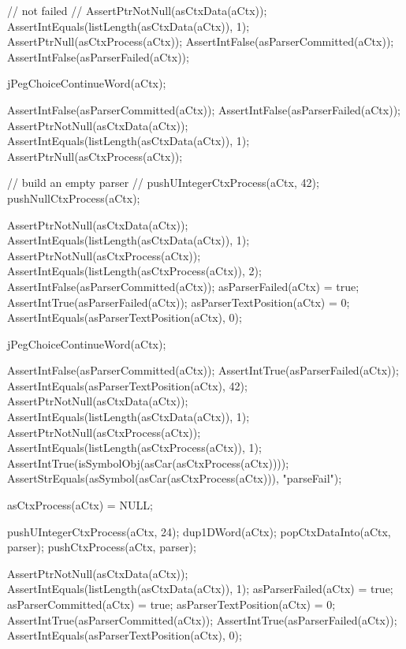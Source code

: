 \startCTest
  // not failed
  //
  AssertPtrNotNull(asCtxData(aCtx));
  AssertIntEquals(listLength(asCtxData(aCtx)), 1);
  AssertPtrNull(asCtxProcess(aCtx));
  AssertIntFalse(asParserCommitted(aCtx));
  AssertIntFalse(asParserFailed(aCtx));
  
  jPegChoiceContinueWord(aCtx);
  
  AssertIntFalse(asParserCommitted(aCtx));
  AssertIntFalse(asParserFailed(aCtx));
  AssertPtrNotNull(asCtxData(aCtx));
  AssertIntEquals(listLength(asCtxData(aCtx)), 1);
  AssertPtrNull(asCtxProcess(aCtx));
\stopCTest
\stopTestCase


\startCTest
  // build an empty parser
  //
  pushUIntegerCtxProcess(aCtx, 42);
  pushNullCtxProcess(aCtx);

  AssertPtrNotNull(asCtxData(aCtx));
  AssertIntEquals(listLength(asCtxData(aCtx)), 1);
  AssertPtrNotNull(asCtxProcess(aCtx));
  AssertIntEquals(listLength(asCtxProcess(aCtx)), 2);
  AssertIntFalse(asParserCommitted(aCtx));
  asParserFailed(aCtx) = true;
  AssertIntTrue(asParserFailed(aCtx));
  asParserTextPosition(aCtx) = 0;
  AssertIntEquals(asParserTextPosition(aCtx), 0);
  
  jPegChoiceContinueWord(aCtx);
  
  AssertIntFalse(asParserCommitted(aCtx));
  AssertIntTrue(asParserFailed(aCtx));
  AssertIntEquals(asParserTextPosition(aCtx), 42);
  AssertPtrNotNull(asCtxData(aCtx));
  AssertIntEquals(listLength(asCtxData(aCtx)), 1);
  AssertPtrNotNull(asCtxProcess(aCtx));
  AssertIntEquals(listLength(asCtxProcess(aCtx)), 1);
  AssertIntTrue(isSymbolObj(asCar(asCtxProcess(aCtx))));
  AssertStrEquals(asSymbol(asCar(asCtxProcess(aCtx))), "parseFail");  
\stopCTest
\stopTestCase


\startCTest
  asCtxProcess(aCtx) = NULL;
  
  pushUIntegerCtxProcess(aCtx, 24);
  dup1DWord(aCtx);
  popCtxDataInto(aCtx, parser);
  pushCtxProcess(aCtx, parser);
  
  AssertPtrNotNull(asCtxData(aCtx));
  AssertIntEquals(listLength(asCtxData(aCtx)), 1);
  asParserFailed(aCtx)       = true;
  asParserCommitted(aCtx)    = true;
  asParserTextPosition(aCtx) = 0;
  AssertIntTrue(asParserCommitted(aCtx));
  AssertIntTrue(asParserFailed(aCtx));
  AssertIntEquals(asParserTextPosition(aCtx), 0);
  
